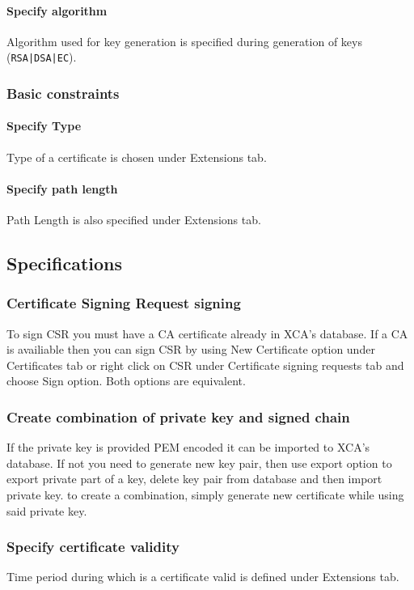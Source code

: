 \documentclass[10pt, a4paper]{report}
\begin{document}
      \paragraph{Specify algorithm}
Algorithm used for key generation is specified during generation of keys (\verb+RSA|DSA|EC+).
    \subsubsection{Basic constraints}
    
      \paragraph{Specify Type}
Type of a certificate is chosen under Extensions tab.
      \paragraph{Specify path length}
Path Length is also specified under Extensions tab.
  \subsection{Specifications}
  
    \subsubsection{Certificate Signing Request signing}
To sign CSR you must have a CA certificate already in XCA's database. If a CA is availiable then you can sign CSR by using New Certificate option under Certificates tab or right click on CSR under Certificate signing requests tab and choose Sign option. Both options are equivalent.    
    \subsubsection{Create combination of private key and signed chain}
If the private key is provided PEM encoded it can be imported to XCA's database. If not you need to generate new key pair, then use export option to export private part of a key, delete key pair from database and then import private key. to create a combination, simply generate new certificate while using said private key.
    \subsubsection{Specify certificate validity}
Time period during which is a certificate valid is defined under Extensions tab.
\end{document}
